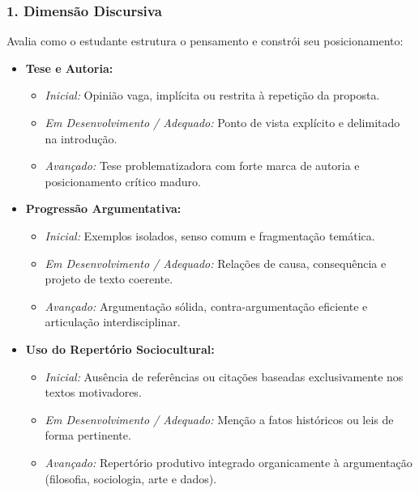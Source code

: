 \documentclass[11pt,a4paper]{article}
\begin{document}
\subsubsection{1. Dimensão Discursiva}
Avalia como o estudante estrutura o pensamento e constrói seu posicionamento:
\begin{itemize}[leftmargin=1.5em]
    \item \textbf{Tese e Autoria:}
    \begin{itemize}
        \item \textit{Inicial:} Opinião vaga, implícita ou restrita à repetição da proposta.
        \item \textit{Em Desenvolvimento / Adequado:} Ponto de vista explícito e delimitado na introdução.
        \item \textit{Avançado:} Tese problematizadora com forte marca de autoria e posicionamento crítico maduro.
    \end{itemize}
    \item \textbf{Progressão Argumentativa:}
    \begin{itemize}
        \item \textit{Inicial:} Exemplos isolados, senso comum e fragmentação temática.
        \item \textit{Em Desenvolvimento / Adequado:} Relações de causa, consequência e projeto de texto coerente.
        \item \textit{Avançado:} Argumentação sólida, contra-argumentação eficiente e articulação interdisciplinar.
    \end{itemize}
    \item \textbf{Uso do Repertório Sociocultural:}
    \begin{itemize}
        \item \textit{Inicial:} Ausência de referências ou citações baseadas exclusivamente nos textos motivadores.
        \item \textit{Em Desenvolvimento / Adequado:} Menção a fatos históricos ou leis de forma pertinente.
        \item \textit{Avançado:} Repertório produtivo integrado organicamente à argumentação (filosofia, sociologia, arte e dados).
    \end{itemize}
\end{itemize}
\end{document}
